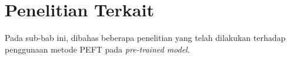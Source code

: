 \section{Penelitian Terkait}

Pada sub-bab ini,  dibahas beberapa penelitian yang telah dilakukan terhadap penggunaan metode PEFT pada \textit{pre-trained model}.
